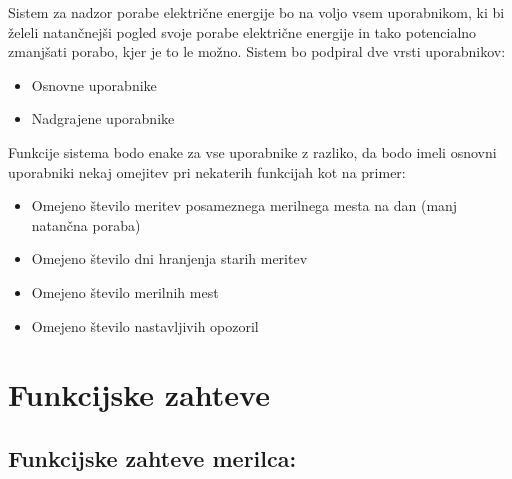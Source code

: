 \documentclass[12pt,a4paper,titlepage,openany]{report}
\begin{document}
Sistem za nadzor porabe električne energije bo na voljo vsem uporabnikom, ki bi želeli natančnejši pogled svoje porabe električne energije in tako potencialno zmanjšati porabo, kjer je to le možno. Sistem bo podpiral dve vrsti uporabnikov:
\begin{itemize}
\item Osnovne uporabnike
\item Nadgrajene uporabnike
\end{itemize}
Funkcije sistema bodo enake za vse uporabnike z razliko, da bodo imeli osnovni uporabniki nekaj omejitev pri nekaterih funkcijah kot na primer:
\begin{itemize}
\item Omejeno število meritev posameznega merilnega mesta na dan (manj natančna poraba)
\item Omejeno število dni hranjenja starih meritev
\item Omejeno število merilnih mest
\item Omejeno število nastavljivih opozoril
\end{itemize}


\section{Funkcijske zahteve}
\thispagestyle{fancy}


\subsection{Funkcijske zahteve merilca:}
\end{document}
